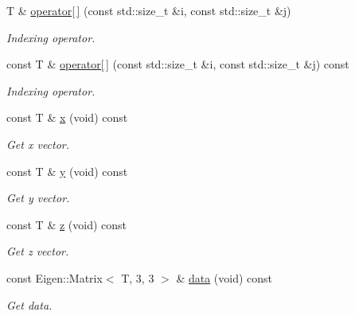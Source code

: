 \begin{DoxyCompactItemize}
T \& \hyperlink{classddd_1_1rotation_a25411622296849f461c6f15aeaf280a0}{operator\mbox{[}$\,$\mbox{]}} (const std\+::size\+\_\+t \&i, const std\+::size\+\_\+t \&j)
\begin{DoxyCompactList}\small\item\em Indexing operator. \end{DoxyCompactList}\item 
const T \& \hyperlink{classddd_1_1rotation_abe1b800d2857b75ad2d00de4743bfa85}{operator\mbox{[}$\,$\mbox{]}} (const std\+::size\+\_\+t \&i, const std\+::size\+\_\+t \&j) const
\begin{DoxyCompactList}\small\item\em Indexing operator. \end{DoxyCompactList}\item 
\mbox{\label{classddd_1_1rotation_a6888d588f65756080db76224a262140b}} 
const T \& \hyperlink{classddd_1_1rotation_a6888d588f65756080db76224a262140b}{x} (void) const
\begin{DoxyCompactList}\small\item\em Get x vector. \end{DoxyCompactList}\item 
\mbox{\label{classddd_1_1rotation_a9abadbab25e48775a4dd73c43f9d03ac}} 
const T \& \hyperlink{classddd_1_1rotation_a9abadbab25e48775a4dd73c43f9d03ac}{y} (void) const
\begin{DoxyCompactList}\small\item\em Get y vector. \end{DoxyCompactList}\item 
\mbox{\label{classddd_1_1rotation_a6128afc3f093ba083b2f79b111990ae7}} 
const T \& \hyperlink{classddd_1_1rotation_a6128afc3f093ba083b2f79b111990ae7}{z} (void) const
\begin{DoxyCompactList}\small\item\em Get z vector. \end{DoxyCompactList}\item 
\mbox{\label{classddd_1_1rotation_a96ca78d491ccc1c1c5b6be44c18e5abd}} 
const Eigen\+::\+Matrix$<$ T, 3, 3 $>$ \& \hyperlink{classddd_1_1rotation_a96ca78d491ccc1c1c5b6be44c18e5abd}{data} (void) const
\begin{DoxyCompactList}\small\item\em Get data. \end{DoxyCompactList}\item 

\end{DoxyCompactItemize}
